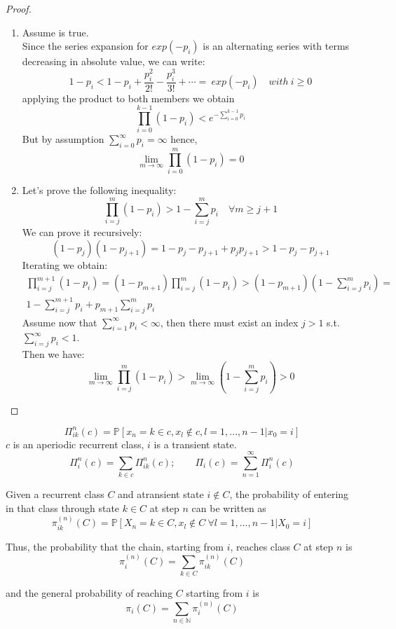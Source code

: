 	\begin{proof}
		\begin{enumerate}
			\item Assume  is true. \\
				Since the series expansion for $exp(-p_i)$ is an alternating series with terms decreasing in absolute value, we can write:
				\begin{equation}
					1-p_i < 1-p_i + \frac{p_i^2}{2!} - \frac{p_i^3}{3!} + \cdots = ~exp(-p_i) \quad with ~i\ge 0
				\end{equation}
				applying the product to both members we obtain
				\begin{equation}
					\prod_{i=0}^{k-1} (1-p_i) < e^{-\sum_{i=0}^{k-1}p_i}
				\end{equation}
				But by assumption $\sum_{i=0}^\infty p_i = \infty$ hence,
				$$ \lim_{m \to \infty} \prod_{i=0}^{m}(1-p_i) = 0 $$

			\item Let's prove the following inequality:
			$$ \prod_{i=j}^m(1-p_i) > 1-\sum_{i=j}^m p_i \quad \forall m \ge j+1$$
			We can prove it recursively:
			$$(1-p_j)(1-p_{j+1}) = 1-p_j - p_{j+1} + p_jp_{j+1} > 1-p_j - p_{j+1}$$
			Iterating we obtain:
			\begin{eqnarray*}
				\prod_{i=j}^{m+1}(1-p_i) = (1-p_{m+1})\prod_{i=j}^m(1-p_i) > (1-p_{m+1})(1-\sum_{i=j}^m p_i) = \\
				1- \sum_{i=j}^{m+1} p_i + p_{m+1}\sum_{i=j}^m p_i
			\end{eqnarray*}
			Assume now that $\sum_{i=1}^\infty p_i < \infty$, then there must exist an index $j>1$ s.t. $\sum_{i=j}^\infty p_i < 1$. \\
			Then we have:
			$$ \lim_{m \to \infty} \prod_{i=j}^m (1-p_i) > \lim_{m \to \infty} (1-\sum_{i=j}^m p_i) > 0 $$
		\end{enumerate}
	\end{proof}

	\begin{definition}[lesson 22/03/17]
		$$\Pi_{ik}^n(c) = \mathbb{P}[x_n = k \in c, x_l \notin c, l=1, ... , n-1 | x_0 =i]$$
		$c$ is an aperiodic recurrent class, $i$ is a transient state.
		$$\Pi_i^n(c) = \sum_{k \in c} \Pi_{ik}^n(c); \qquad \Pi_i(c) = \sum_{n=1}^\infty \Pi_i^n(c)$$
	\end{definition}


	\begin{definition} \label{def:falling_probability}
		Given a recurrent class $C$ and atransient state $i \notin C$, the probability of entering in that class through state $k \in C$ at step $n$ can be written as
		$$ \pi_{ik}^{(n)}(C) = \mathbb{P}[X_n = k \in C, x_l \notin C ~ \forall l=1, ..., n-1 | X_0 = i] $$

		Thus, the probability that the chain, starting from $i$, reaches class $C$ at step $n$ is
		$$ \pi_{i}^{(n)}(C) = \sum_{k \in C} \pi_{ik}^{(n)}(C) $$

		and the general probability of reaching $C$ starting from $i$ is
		$$ \pi_i(C) = \sum_{n \in \mathbb{N}} \pi_i^{(n)}(C) $$
	\end{definition}


